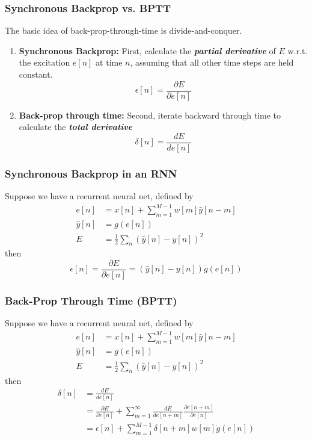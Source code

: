 \documentclass{beamer}
\begin{document}
\begin{frame}
  \frametitle{Synchronous Backprop vs. BPTT}

  The basic idea of back-prop-through-time is divide-and-conquer.
  \begin{enumerate}
    \item {\bf Synchronous Backprop:} First, calculate the {\bf\em
      partial derivative} of $E$ w.r.t. the excitation $e[n]$ at time
      $n$, assuming that all other time steps are held constant.
      \[
      \epsilon[n] = \frac{\partial E}{\partial e[n]}
      \]
    \item {\bf Back-prop through time:} Second, iterate backward
      through time to calculate the {\bf\em total derivative}
      \[
      \delta[n] = \frac{dE}{d e[n]}
      \]
  \end{enumerate}
\end{frame}

\begin{frame}
  \frametitle{Synchronous Backprop in an RNN}
  Suppose we have a recurrent neural net, defined by
  \begin{align*}
    e[n] &= x[n] + \sum_{m=1}^{M-1}w[m] \hat{y}[n-m]\\
    \hat{y}[n] &= g\left(e[n]\right)\\
    E &= \frac{1}{2}\sum_n\left(\hat{y}[n]-y[n]\right)^2
  \end{align*}
  then
  \[
  \epsilon[n]=\frac{\partial E}{\partial e[n]} = \left(\hat{y}[n]-y[n]\right) \dot{g}(e[n])
  \]
\end{frame}
  
\begin{frame}
  \frametitle{Back-Prop Through Time (BPTT)}
  Suppose we have a recurrent neural net, defined by
  \begin{align*}
    e[n] &= x[n] + \sum_{m=1}^{M-1}w[m] \hat{y}[n-m]\\
    \hat{y}[n] &= g\left(e[n]\right)\\
    E &= \frac{1}{2}\sum_n\left(\hat{y}[n]-y[n]\right)^2
  \end{align*}
  then
  \begin{align*}
    \delta[n]&=\frac{dE}{de[n]}\\
    &=\frac{\partial E}{\partial e[n]}+
    \sum_{m=1}^{\infty}\frac{dE}{de[n+m]}\frac{\partial e[n+m]}{\partial e[n]}\\
    &=\epsilon[n]+\sum_{m=1}^{M-1}\delta[n+m]w[m]\dot{g}(e[n])
  \end{align*}
\end{frame}
  
\end{document}
